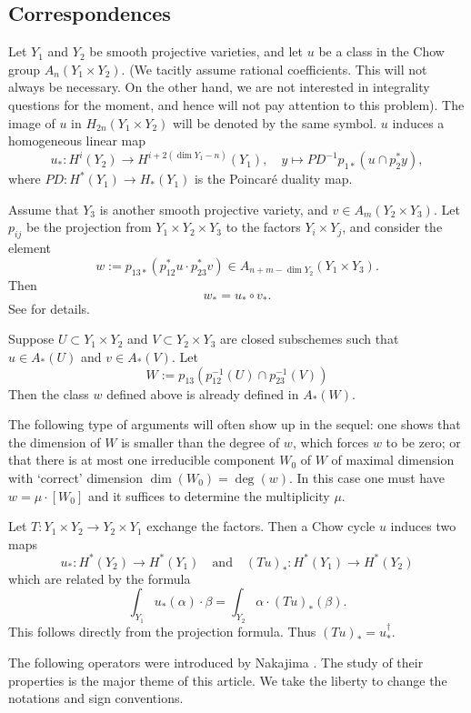 \documentclass[twoside,11pt]{article}
\begin{document}
\subsection{Correspondences}

Let $Y_1$ and $Y_2$ be smooth projective varieties, and let $u$ be a 
class in the Chow group $A_n(Y_1\times Y_2)$. (We tacitly assume rational
coefficients. This will not always be necessary. On the other hand, we are
not interested in integrality questions for the moment, and hence will not
pay attention to this problem). The image of $u$
in $H_{2n}(Y_1\times Y_2)$ will be denoted by the same symbol.
$u$ induces a homogeneous linear map
$$u_*:H^i(Y_2)\to H^{i+2(\dim Y_1-n)}(Y_1),\quad y\mapsto PD^{-1}p_{1*}(u\cap p_2^*y),
$$
where $PD:H^*(Y_1)\to H_*(Y_1)$ is the Poincar\'e duality map.

Assume that $Y_3$ is another smooth projective variety, and $v\in A_m(Y_2\times Y_3)$. Let $p_{ij}$ be the projection from $Y_1\times Y_2\times Y_3$ to
the  factors $Y_i\times Y_j$, and consider the element
$$w:=p_{13*}(p_{12}^*u\cdot p_{23}^*v)\in A_{n+m-\dim Y_2}(Y_1\times Y_3).
$$
Then
$$w_*=u_*\circ v_*.$$
See \cite[Ch.\ 16]{Fulton} for details. 

Suppose $U\subset Y_1\times Y_2$ and $V\subset Y_2\times Y_3$ are closed
subschemes such that $u\in A_*(U)$ and $v\in A_*(V)$. Let
$$W:=p_{13}(p_{12}^{-1}(U)\cap p_{23}^{-1}(V))$$
Then the class $w$ defined above is already defined in $A_*(W)$.

The following type of arguments will often show up in the sequel: one shows
that the dimension of $W$ is smaller than the degree of $w$, which forces
$w$ to be zero; or that there is at most one irreducible component $W_0$
of $W$ of maximal dimension with `correct' dimension $\dim(W_0)=\deg(w)$.
In this case one must have $w=\mu\cdot [W_0]$ and it suffices to determine
the multiplicity $\mu$.
 
Let $T:Y_1\times Y_2\to Y_2\times Y_1$ exchange the factors. Then a Chow cycle
$u$ induces two maps
$$u_*:H^*(Y_2)\to H^*(Y_1)\quad\mbox{and}\quad(Tu)_*:H^*(Y_1)\to H^*(Y_2)$$
which are related by the formula
$$\int_{Y_1}u_*(\alpha)\cdot\beta=\int_{Y_2}\alpha\cdot(Tu)_*(\beta).$$
This follows directly from the projection formula. Thus $(Tu)_*=u_*^\dagger$.

The following operators were introduced by Nakajima \cite{Nakajima}. The
study of their properties is the major theme of this article. We take the liberty to change the notations and sign conventions.
\end{document}
